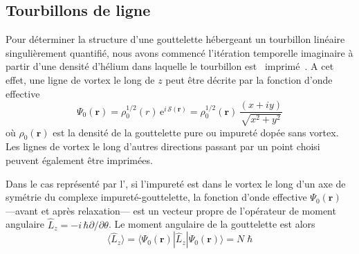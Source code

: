 		\subsection*{Tourbillons de ligne}
			Pour déterminer la structure d'une gouttelette hébergeant un tourbillon linéaire singulièrement quantifié, nous avons commencé l'itération temporelle imaginaire à partir d'une densité d'hélium dans laquelle le tourbillon est \guillemotleft~imprimé~\guillemotright. A cet effet, une ligne de vortex le long de $z$ peut être décrite par la fonction d'onde effective 
			\begin{equation}
				\Psi_0(\mathbf{r}) = \rho_0^{1/2}(r)\,\mathrm{e}^{i\,{\mathcal S}(\mathbf{r})} = \rho_0^{1/2}(\mathbf{r}) \, \frac{(x + i y)}{\sqrt{x^2 + y^2}} \label{eq11-sum}
			\end{equation}
			où $\rho_0(\mathbf{r})$ est la densité de la gouttelette pure ou impureté dopée sans vortex. Les lignes de vortex le long d'autres directions passant par un point choisi peuvent également être imprimées\citep{Pi07}.

			Dans le cas représenté par l', si l'impureté est dans le vortex le long d'un axe de symétrie du complexe impureté-gouttelette, la fonction d'onde effective $\Psi_0({\mathbf r})$ ---avant et après relaxation--- est un vecteur propre de l'opérateur de moment angulaire $\hat{L}_z=-i\,\hbar\partial/\partial\theta$.
			Le moment angulaire de la gouttelette est alors
			\begin{equation}
				\langle \hat{L}_z \rangle = \langle \Psi_0(\mathbf{r}) | \hat{L}_z | \Psi_0(\mathbf{r}) \rangle = N \; \hbar
				\label{eq12-sum}
			\end{equation}


